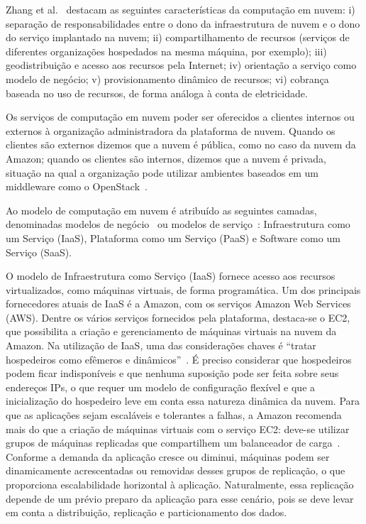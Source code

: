 Zhang et al.~\cite{Zhang2010Cloud} destacam as seguintes características da computação em nuvem: i) separação de responsabilidades entre o dono da infraestrutura de nuvem e o dono do serviço implantado na nuvem; ii) compartilhamento de recursos (serviços de diferentes organizações hospedados na mesma máquina, por exemplo); iii) geodistribuição e acesso aos recursos pela Internet; iv) orientação a serviço como modelo de negócio; v) provisionamento dinâmico de recursos; vi) cobrança baseada no uso de recursos, de forma análoga à conta de eletricidade.

Os serviços de computação em nuvem poder ser oferecidos a clientes internos ou externos à organização administradora da plataforma de nuvem. Quando os clientes são externos dizemos que a nuvem é pública, como no caso da nuvem da Amazon; quando os clientes são internos, dizemos que a nuvem é privada, situação na qual a organização pode utilizar ambientes baseados em um middleware como o OpenStack~\cite{Zhang2010Cloud}.

Ao modelo de computação em nuvem é atribuído as seguintes camadas, denominadas modelos de negócio~\cite{Zhang2010Cloud} ou modelos de serviço~\cite{Nist2011Cloud}: Infraestrutura como um Serviço (IaaS), Plataforma como um Serviço (PaaS) e Software como um Serviço (SaaS). 

O modelo de Infraestrutura como Serviço (IaaS) fornece acesso aos recursos virtualizados, como máquinas virtuais, de forma programática. Um dos principais fornecedores atuais de IaaS é a Amazon, com os serviços Amazon Web Services (AWS). Dentre os vários serviços fornecidos pela plataforma, destaca-se o EC2, que possibilita a criação e gerenciamento de máquinas virtuais na nuvem da Amazon. Na utilização de IaaS, uma das considerações chaves é ``tratar hospedeiros como efêmeros e dinâmicos''~\cite{Amazon2012Practices}. É preciso considerar que hospedeiros podem ficar indisponíveis e que nenhuma suposição pode ser feita sobre seus endereços IPs, o que requer um modelo de configuração flexível e que a inicialização do hospedeiro leve em conta essa natureza dinâmica da nuvem. Para que as aplicações sejam escaláveis e tolerantes a falhas, a Amazon recomenda mais do que a criação de máquinas virtuais com o serviço EC2: deve-se utilizar grupos de máquinas replicadas que compartilhem um balanceador de carga~\cite{Amazon2012Practices}. Conforme a demanda da aplicação cresce ou diminui, máquinas podem ser dinamicamente acrescentadas ou removidas desses grupos de replicação, o que proporciona escalabilidade horizontal à aplicação. Naturalmente, essa replicação depende de um prévio preparo da aplicação para esse cenário, pois se deve levar em conta a distribuição, replicação e particionamento dos dados. 

